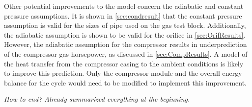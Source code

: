 Other potential improvements to the model concern the adiabatic and constant pressure assumptions.
It is shown in \cref{sec:condresult} that the constant pressure assumption is valid for the sizes
of pipe used on the gas test block.
Additionally, the adiabatic assumption is shown to be valid for the orifice in \cref{sec:OrifResults}.
However, the adiabatic assumption for the compressor results in underprediction of the compressor
gas horsepower, as discussed in \cref{sec:CompResults}.
A model of the heat transfer from the compressor casing to the ambient conditions is likely to
improve this prediction.
Only the compressor module and the overall energy balance 
for the cycle would need to be modified to implement this improvement.

\emph{How to end? Already summarized everything at the beginning.}